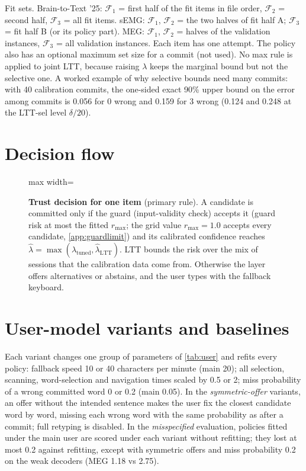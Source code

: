 \noindent Fit sets. Brain-to-Text '25: $\mathcal{F}_1$ = first half of the fit items in file order, $\mathcal{F}_2$ = second half, $\mathcal{F}_3$ = all fit items. sEMG: $\mathcal{F}_1$, $\mathcal{F}_2$ = the two halves of fit half A; $\mathcal{F}_3$ = fit half B (or its policy part). MEG: $\mathcal{F}_1$, $\mathcal{F}_2$ = halves of the validation instances, $\mathcal{F}_3$ = all validation instances. Each item has one attempt. The policy also has an optional maximum set size for a commit (not used). No max rule is applied to joint LTT, because raising $\lambda$ keeps the marginal bound but not the selective one. A worked example of why selective bounds need many commits: with 40 calibration commits, the one-sided exact 90\% upper bound on the error among commits is 0.056 for 0 wrong and 0.159 for 3 wrong (0.124 and 0.248 at the LTT-sel level $\delta/20$).

\section{Decision flow}
\label{app:decision}

\begin{figure}[H]
  \centering
  \begin{adjustbox}{max width=\linewidth}\end{adjustbox}
  \caption{\textbf{Trust decision for one item} (primary rule). A candidate is committed only if the guard (input-validity check) accepts it (guard risk at most the fitted $r_{\max}$; the grid value $r_{\max} = 1.0$ accepts every candidate, \cref{app:guardlimit}) and its calibrated confidence reaches $\hat\lambda = \max(\lambda_{\mathrm{tuned}}, \hat\lambda_{\mathrm{LTT}})$. LTT bounds the risk over the mix of sessions that the calibration data come from. Otherwise the layer offers alternatives or abstains, and the user types with the fallback keyboard.}
  \label{fig:decision}
\end{figure}

\section{User-model variants and baselines}
\label{app:user}

Each variant changes one group of parameters of \cref{tab:user} and refits every policy: fallback speed 10 or 40 characters per minute (main 20); all selection, scanning, word-selection and navigation times scaled by 0.5 or 2; miss probability of a wrong committed word 0 or 0.2 (main 0.05). In the \emph{symmetric-offer} variants, an offer without the intended sentence makes the user fix the closest candidate word by word, missing each wrong word with the same probability as after a commit; full retyping is disabled. In the \emph{misspecified} evaluation, policies fitted under the main user are scored under each variant without refitting; they lost at most 0.2 \ewpm{} against refitting, except with symmetric offers and miss probability 0.2 on the weak decoders (MEG 1.18 vs 2.75).

